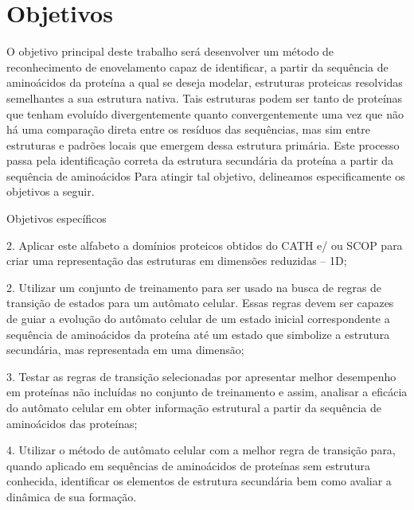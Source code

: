 \chapter{Objetivos}

O objetivo principal deste trabalho será desenvolver um método de reconhecimento de
enovelamento capaz de identificar, a partir da sequência de aminoácidos da proteína a qual se
deseja modelar, estruturas proteicas resolvidas semelhantes a sua estrutura nativa. Tais
estruturas podem ser tanto de proteínas que tenham evoluído divergentemente quanto
convergentemente uma vez que não há uma comparação direta entre os resíduos das
sequências, mas sim entre estruturas e padrões locais que emergem dessa estrutura primária. Este processo passa pela identificação correta da estrutura secundária da proteína a partir da sequência de aminoácidos
Para atingir tal objetivo, delineamos especificamente os objetivos a seguir.

Objetivos específicos

2. Aplicar este alfabeto a domínios proteicos obtidos do CATH e/ ou SCOP para
criar uma representação das estruturas em dimensões reduzidas – 1D;

2.  Utilizar um conjunto de treinamento para ser usado na busca de regras de
transição de estados para um autômato celular. Essas regras devem ser capazes de guiar a
evolução do autômato celular de um estado inicial correspondente a sequência
de aminoácidos da proteína até um estado que simbolize a estrutura secundária, mas representada em uma dimensão;

3. Testar as regras de transição selecionadas por apresentar melhor desempenho em
proteínas não incluídas no conjunto de treinamento e assim, analisar a eficácia do
autômato celular em obter informação estrutural a partir da sequência de
aminoácidos das proteínas;


4. Utilizar o método de autômato celular com a melhor regra de transição para,
quando aplicado em sequências de aminoácidos de proteínas sem estrutura
conhecida, identificar os elementos de estrutura secundária bem como avaliar a dinâmica de sua formação.





